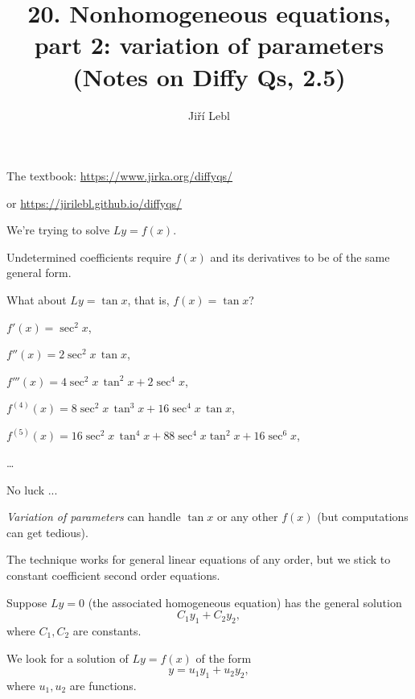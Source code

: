 \documentclass[10pt,aspectratio=169]{beamer}
\author{Ji\v{r}\'i Lebl}
\institute[OSU]{%
Oklahoma State University%
}
\title{20. Nonhomogeneous equations,\\part 2: variation of parameters\\(Notes on Diffy Qs, 2.5)}
\date{}
\begin{document}
\begin{frame}
\titlepage


\begin{center}
The textbook: \url{https://www.jirka.org/diffyqs/}

or \url{https://jirilebl.github.io/diffyqs/}
\end{center}
\end{frame}

\begin{frame}
We're trying to solve $Ly = f(x)$.

\medskip
\pause

Undetermined coefficients require $f(x)$ and its derivatives
to be of the same general form.

\medskip
\pause

What about $Ly = \tan x$, that is, $f(x) = \tan x$?

\medskip
\pause

$f'(x) = \sec^2 x$,

\pause
$f''(x) = 2\sec^2 x \, \tan x$,

\pause
$f'''(x) = 4 \sec^2 x \, \tan^2 x + 2 \sec^4 x$,

\pause
$f^{(4)}(x) = 8 \sec^2 x \, \tan^3 x + 16 \sec^4 x \, \tan x$,

\pause
$f^{(5)}(x) = 16\sec^2 x \, \tan^4 x + 88 \sec^4 x \tan^2 x + 16 \sec^6 x$,

\ldots

\medskip
\pause

No luck ...

\end{frame}

\begin{frame}
\emph{Variation of parameters} can handle $\tan x$ or any other $f(x)$ (but
computations can get tedious).

\medskip
\pause

The technique works for general linear equations of any order,
but we stick to constant coefficient second order equations.

\medskip
\pause

Suppose $Ly= 0$ (the associated homogeneous equation) has the general
solution
\[
C_1 y_1 + C_2 y_2 ,
\]
where $C_1,C_2$ are constants.

\medskip
\pause

We look for a solution of $Ly=f(x)$ of the form
\[
y  = u_1 y_1 + u_2 y_2 ,
\]
where $u_1,u_2$ are functions.

\end{frame}
\end{document}
